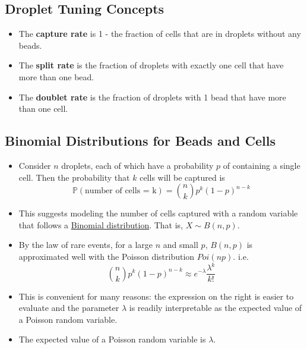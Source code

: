 \documentclass[10pt]{article}
\begin{document}
\subsection*{Droplet Tuning Concepts}
\begin{itemize}
    \item The \textbf{capture rate} is 1 - the fraction of cells that are in droplets without any beads.
    \item The \textbf{split rate} is the fraction of droplets with exactly one cell that have more than one bead.
    \item The \textbf{doublet rate} is the fraction of droplets with 1 bead that have more than one cell.
\end{itemize}

\subsection*{Binomial Distributions for Beads and Cells}
\begin{itemize}
    \item Consider $n$ droplets, each of which have a probability $p$ of containing a single cell.  Then the probability that $k$ cells will be captured is 
    \[\mathbb{P}(\text{number of cells = k}) = {n \choose k} p^k (1 - p)^{n - k}\]
    \item This suggests modeling the number of cells captured with a random variable that follows a \underline{Binomial distribution}.  That is, $X \sim B(n, p)$.
    \item By the law of rare events, for a large $n$ and small $p$, $B(n, p)$ is approximated well with the Poisson distribution $Poi(np)$.  i.e.
    \[{n \choose k} p^k (1 - p)^{n - k} \approx e^{-\lambda} \frac{\lambda^k}{k!}\]
    \item This is convenient for many reasons: the expression on the right is easier to evaluate and the parameter $\lambda$ is readily interpretable as the expected value of a Poisson random variable.
    \item The expected value of a Poisson random variable is $\lambda$.
\end{itemize}
\end{document}
